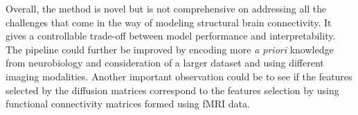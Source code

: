 \documentclass[msthesis.tex]{subfiles}
\begin{document}
Overall, the method is novel but is not comprehensive on addressing all the challenges that come in the way of modeling structural brain connectivity. It gives a controllable trade-off between model performance and interpretability. The pipeline could further be improved by encoding more \textit{a priori} knowledge from neurobiology and consideration of a larger dataset and using different imaging modalities. Another important observation could be to see if the features selected by the diffusion matrices correspond to the features selection by using functional connectivity matrices formed using fMRI data.
\iffalse
It is a good stepping stone on trying to model the brain and guide clinical decisions. It achieves good performance on gender classification/ Gender differences important guide decision making in Alzheimer's which is more common in females than in males.
\fi
\end{document}
